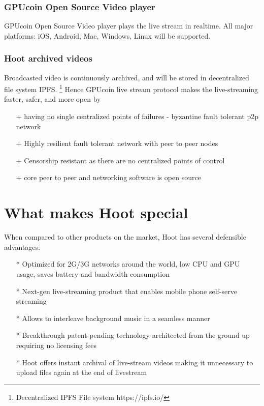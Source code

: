 \documentclass{article}
\begin{document}
\subsubsection{GPUcoin Open Source Video player}
GPUcoin Open Source Video player plays the live stream in realtime. All major platforms: iOS, Android, Mac, Windows, Linux will be supported.

\subsubsection{Hoot archived videos}
Broadcasted video is continuously archived, and will be stored in decentralized file system IPFS. \footnote{Decentralized IPFS File system https://ipfs.io/} Hence GPUcoin live stream protocol makes the live-streaming faster, safer, and more open by
\begin{itemize}
 \item[+]having no single centralized points of failures - byzantine fault tolerant p2p network
 \item[+]Highly resilient fault tolerant network with peer to peer nodes
 \item[+]Censorship resistant as there are no centralized points of control
 \item[+]core peer to peer and networking software is open source
\end{itemize}

\section{What makes Hoot special}
When compared to other products on the market, Hoot has several defensible advantages:
\begin{itemize}
\item[*]Optimized for 2G/3G networks around the world, low CPU and GPU usage, saves battery and bandwidth consumption
\item[*]Next-gen live-streaming product that enables mobile phone self-serve streaming 
\item[*]Allows to interleave background music in a seamless manner
\item[*]Breakthrough patent-pending technology architected from the ground up requiring no licensing fees
\item[*]Hoot offers instant archival of live-stream videos making it unnecessary to upload files again at the end of livestream

\end{itemize}
\end{document}
